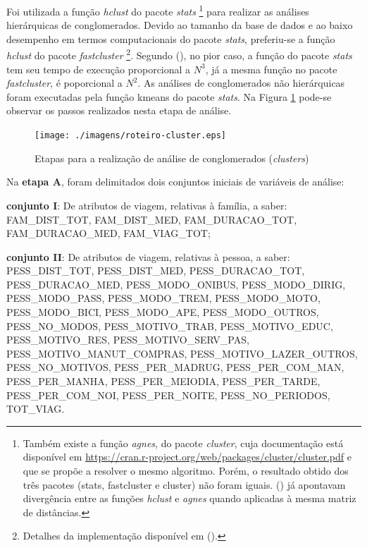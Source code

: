 
Foi utilizada a função \textit{hclust} do pacote \textit{stats}
\footnote{Também existe a função \textit{agnes}, do pacote \textit{cluster}, cuja documentação está disponível em \url{https://cran.r-project.org/web/packages/cluster/cluster.pdf} e que se propõe a resolver o mesmo algoritmo. Porém, o resultado obtido dos três pacotes (stats, fastcluster e cluster) não foram iguais.  (\citeyear{MURTAGH1975}) já apontavam divergência entre as funções \textit{hclust} e \textit{agnes} quando aplicadas à mesma matriz de distâncias.} \cite{RTEAM2011} para realizar as análises hierárquicas de conglomerados. Devido ao tamanho da base de dados e ao baixo desempenho em termos computacionais do pacote \textit{stats}, preferiu-se a função \textit{hclust} do pacote \textit{fastcluster}
\footnote{Detalhes da implementação disponível em  (\citeyear{MULLNER2011}).}. 
Segundo  (\citeyear{MULLNER2013}), no pior caso, a função do pacote \textit{stats} tem seu tempo de execução proporcional a $N^3$, já a mesma função no pacote \textit{fastcluster}, é poporcional a $N^2$. As análises de conglomerados não hierárquicas foram executadas pela função kmeans do pacote \textit{stats}. Na Figura \ref{fig:roteiro-cluster} pode-se observar os passos realizados nesta etapa de análise.

\begin{figure}[htb]%
    \caption{\label{fig:roteiro-cluster}Etapas para a realização de análise de conglomerados (\textit{clusters})}%
    \begin{center}%
        \texttt{[image: ./imagens/roteiro-cluster.eps]}%
    \end{center}%
\end{figure}%


Na \textbf{etapa A}, foram delimitados dois conjuntos iniciais de variáveis de análise:
\begin{compactitem}
\item \textbf{conjunto I}: De atributos de viagem, relativas à família, a saber: FAM_DIST_TOT, FAM_DIST_MED, FAM_DURACAO_TOT, FAM_DURACAO_MED, FAM_VIAG_TOT;
\item \textbf{conjunto II}: De atributos de viagem, relativas à pessoa, a saber: PESS_DIST_TOT, PESS_DIST_MED, PESS_DURACAO_TOT, PESS_DURACAO_MED, PESS_MODO_ONIBUS, PESS_MODO_DIRIG, PESS_MODO_PASS, PESS_MODO_TREM, PESS_MODO_MOTO, PESS_MODO_BICI, PESS_MODO_APE, PESS_MODO_OUTROS, PESS_NO_MODOS, PESS_MOTIVO_TRAB, PESS_MOTIVO_EDUC, PESS_MOTIVO_RES, PESS_MOTIVO_SERV_PAS, PESS_MOTIVO_MANUT_COMPRAS, PESS_MOTIVO_LAZER_OUTROS, PESS_NO_MOTIVOS, PESS_PER_MADRUG, PESS_PER_COM_MAN, PESS_PER_MANHA, PESS_PER_MEIODIA, PESS_PER_TARDE, PESS_PER_COM_NOI, PESS_PER_NOITE, PESS_NO_PERIODOS, TOT_VIAG.
\end{compactitem}

